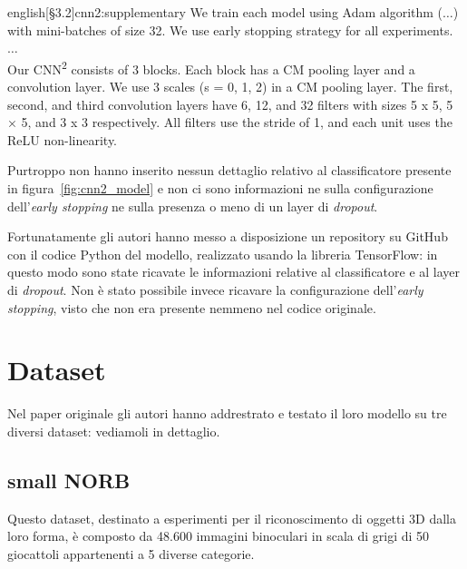 \documentclass[italian,12pt,a4paper,oneside,final]{report}
\begin{document}
\begin{foreigndisplaycquote}{english}[\S3.2]{cnn2:supplementary}
We train each model using Adam algorithm ($\ldots$) with mini-batches of size 32.
We use early stopping strategy for all experiments.\\
$\ldots$\\
Our CNN\textsuperscript{2} consists of 3 blocks. Each block has a CM pooling layer and a convolution layer.
We use 3 scales (s = 0, 1, 2) in a CM pooling layer.
The first, second, and third convolution layers have 6, 12, and 32 filters with sizes 5 x 5, 5 × 5, and 3 x 3 respectively.
All filters use the stride of 1, and each unit uses the ReLU non-linearity.
\end{foreigndisplaycquote}
Purtroppo non hanno inserito nessun dettaglio relativo al classificatore presente in figura~\ref{fig:cnn2_model} e non ci sono informazioni ne sulla configurazione dell'\textit{early stopping} ne sulla presenza o meno di un layer di \textit{dropout}.

Fortunatamente gli autori hanno messo a disposizione un repository\cite{cnn2:repository} su GitHub con il codice Python del modello, realizzato usando la libreria TensorFlow: in questo modo sono state ricavate le informazioni relative al classificatore e al layer di \textit{dropout}.
Non è stato possibile invece ricavare la configurazione dell'\textit{early stopping}, visto che non era presente nemmeno nel codice originale.

\section{Dataset}
Nel paper originale gli autori hanno addrestrato e testato il loro modello su tre diversi dataset: vediamoli in dettaglio.

\subsection{small NORB}
Questo dataset\cite{dataset:smallnorb}, destinato a esperimenti per il riconoscimento di oggetti 3D dalla loro forma, è composto da 48.600 immagini binoculari in scala di grigi di 50 giocattoli appartenenti a 5 diverse categorie.
\end{document}
